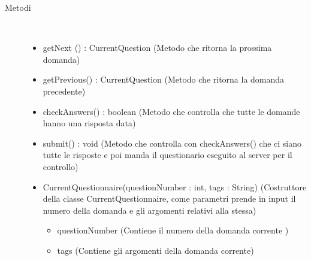 \begin{description}
\item[Metodi] \hfill \\
 \vspace{-7mm}
\begin{itemize}
\item getNext () : CurrentQuestion (Metodo che ritorna la prossima domanda)
\item getPrevious() : CurrentQuestion (Metodo che ritorna la domanda precedente)
\item checkAnswers() : boolean (Metodo che controlla che tutte le domande hanno una risposta data)
\item submit() : void (Metodo che controlla con checkAnswers() che ci siano tutte le risposte e poi manda il questionario eseguito al server per il controllo)
\item CurrentQuestionnaire(questionNumber : int, tags : String) (Costruttore della classe CurrentQuestionnaire, come parametri prende in input il numero della domanda e gli argomenti relativi alla stessa)\begin{itemize}
\item questionNumber (Contiene il numero della domanda corrente )
\item tags (Contiene gli argomenti della domanda corrente)
\end{itemize}

\end{itemize}

\end{description}

\vspace{0.5cm}

